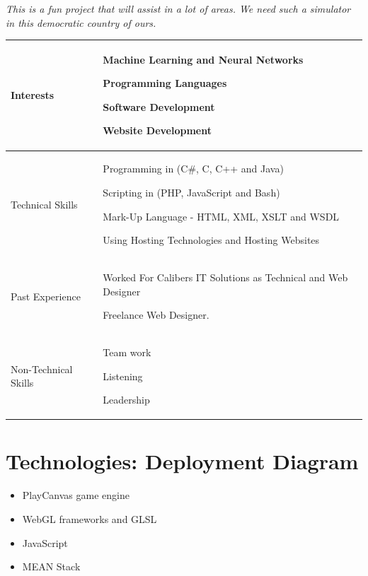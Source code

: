 \documentclass{article}
\begin{document}
 	\textit{This is a fun project that will assist in a lot of areas. We need such a simulator in this democratic country of ours.}

\begin{center}
\begin{tabularx}{1.0\textwidth}{|p{3cm}|X|}
\hline
 {\LARGE Interests} & 
 \begin{compactitem}
     \item {\large Machine Learning and Neural Networks}
     \item {\large Programming Languages}
     \item {\large Software Development}
     \item {\large Website Development}
 \end{compactitem} \\ 
 \hline
 {\LARGE Technical Skills} & 
 \begin{compactitem}
     \item {\large Programming in (C#, C, C++ and Java)} 
     \item {\large Scripting in (PHP, JavaScript and Bash)}
     \item {\large Mark-Up Language - HTML, XML, XSLT and WSDL}
     \item {\large Using Hosting Technologies and Hosting Websites}
 \end{compactitem} \\ 
 \hline
 {\LARGE Past Experience} & 
 \begin{compactitem}
     \item {\large Worked For Calibers IT Solutions as Technical and Web Designer}
     \item {\large Freelance Web Designer.}
 \end{compactitem} \\ 
 \hline
 {\LARGE Non-Technical Skills} & 
 \begin{compactitem}
     \item {\large Team work}
     \item {\large Listening}
     \item {\large Leadership}
 \end{compactitem} \\
 \hline 
\end{tabularx}
\end{center}
\pagebreak
\section{Technologies: Deployment Diagram}
\begin{itemize}
	\item PlayCanvas game engine
	\item WebGL frameworks and GLSL
	\item JavaScript
	\item MEAN Stack
\end{itemize}
\end{document}
